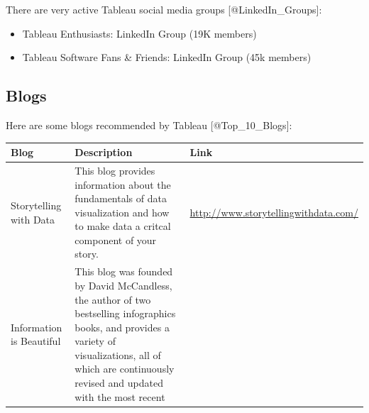 \documentclass[]{book}
\providecommand{\tightlist}{%
  \setlength{\itemsep}{0pt}\setlength{\parskip}{0pt}}
\theoremstyle{definition}
\theoremstyle{definition}
\theoremstyle{definition}
\theoremstyle{remark}
\begin{document}
There are very active Tableau social media groups
{[}@LinkedIn\_Groups{]}:

\begin{itemize}
\tightlist
\item
  Tableau Enthusiasts: LinkedIn Group (19K members)
\item
  Tableau Software Fans \& Friends: LinkedIn Group (45k members)
\end{itemize}

\subsection{Blogs}\label{blogs}

Here are some blogs recommended by Tableau {[}@Top\_10\_Blogs{]}:

\begin{longtable}[]{@{}lll@{}}
\toprule
\begin{minipage}[b]{0.11\columnwidth}\raggedright\strut
\textbf{Blog}\strut
\end{minipage} & \begin{minipage}[b]{0.20\columnwidth}\raggedright\strut
\textbf{Description}\strut
\end{minipage} & \begin{minipage}[b]{0.11\columnwidth}\raggedright\strut
\textbf{Link}\strut
\end{minipage}\tabularnewline
\midrule
\endhead
\begin{minipage}[t]{0.11\columnwidth}\raggedright\strut
Storytelling with Data\strut
\end{minipage} & \begin{minipage}[t]{0.20\columnwidth}\raggedright\strut
This blog provides information about the fundamentals of data
visualization and how to make data a critcal component of your
story.\strut
\end{minipage} & \begin{minipage}[t]{0.11\columnwidth}\raggedright\strut
\url{http://www.storytellingwithdata.com/}\strut
\end{minipage}\tabularnewline
\begin{minipage}[t]{0.11\columnwidth}\raggedright\strut
Information is Beautiful\strut
\end{minipage} & \begin{minipage}[t]{0.20\columnwidth}\raggedright\strut
This blog was founded by David McCandless, the author of two bestselling
infographics books, and provides a variety of visualizations, all of
which are continuously revised and updated with the most recent

\end{minipage}
\end{longtable}
\end{document}
